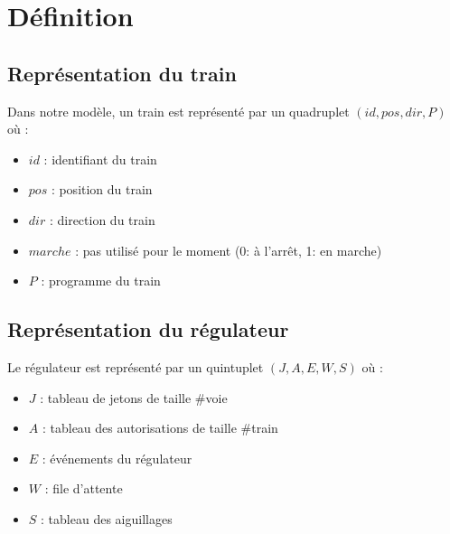 \documentclass[12pt]{article}
\begin{document}
\newcommand\ruleCrash[2]{ %
    \inferrule
        {#1 \neq #2}
        {\Gamma, \train{#1}{pos}{dir}{P}, \train{#2}{pos}{dir'}{P'}  \Rightarrow \bot}
}

\newcommand\ruleCrashSec[3]{ %
    \inferrule
        {\lnot suiv(#2, #3) = \emptyset \\ #3 \neq * \\ R.A[#1] \neq #2}
        {\trainfull{#1}{#2}{#3}{P}, R \Rightarrow \bot}
}


\maketitle


\section{Définition}

\subsection{Représentation du train}
Dans notre modèle, un train est représenté par un quadruplet $(id, pos, dir, P)$ où :
\begin{itemize}
    \item $id$ : identifiant du train
    \item $pos$ : position du train 
    \item $dir$ : direction du train
    \item $marche$ : pas utilisé pour le moment (0: à l'arrêt, 1: en marche)
    \item $P$ : programme du train
\end{itemize}

\subsection{Représentation du régulateur}
Le régulateur est représenté par un quintuplet $(J, A, E, W, S)$ où :
\begin{itemize}
    \item $J$ : tableau de jetons de taille $\#$voie
    \item $A$ : tableau des autorisations de taille $\#$train
    \item $E$ : événements du régulateur
    \item $W$ : file d'attente
    \item $S$ : tableau des aiguillages
\end{itemize}
\end{document}
